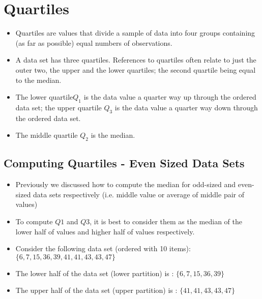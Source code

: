 \documentclass[a4paper,12pt]{article}
\begin{document}

	\section*{Quartiles}
	
	\begin{itemize}
		\item Quartiles are values that divide a sample of data into four groups containing (as far as possible) equal numbers of observations.
		\item 
		A data set has three quartiles. References to quartiles often relate to just the outer two, the upper and the lower quartiles; the second quartile being equal to the median. \item The lower quartile$Q_1$  is the data value a quarter way up through the ordered data set; the upper quartile $Q_3$ is the data value a quarter way down through the ordered data set. \item The middle quartile $Q_2$ is the median.
	\end{itemize}
\subsection*{Computing Quartiles - Even Sized Data Sets}
	\begin{itemize}
		\item Previously we discussed how to compute the median for odd-sized and even-sized data sets respectively (i.e. middle value or average of middle pair of values)
		\item To compute $Q1$ and $Q3$, it is best to consider them as the median of the lower half of values and higher half of values respectively. \bigskip
		\item Consider the following data set (ordered with 10 items):  $\{ 6, 7 ,15, 36, 39, 41, 41 ,43, 43, 47 \}$
		\item The lower half of the data set (lower partition) is : $\{ 6, 7 ,15, 36, 39 \}$
		\item The upper half of the data set (upper partition) is : $\{ 41, 41 ,43, 43, 47 \}$
	\end{itemize}
\end{document}
